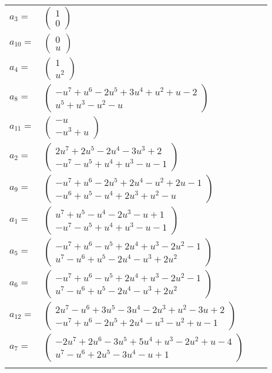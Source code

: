 \documentclass[1p]{elsarticle_modified}
\theoremstyle{definition}
\begin{document}
\begin{tabular}{m{7pt} m{180pt} m{7pt} m{180pt} }
\flushright $a_{3}=$&$\begin{pmatrix}1\\0\end{pmatrix}$ \\
\flushright $a_{10}=$&$\begin{pmatrix}0\\u\end{pmatrix}$ \\
\flushright $a_{4}=$&$\begin{pmatrix}1\\u^2\end{pmatrix}$ \\
\flushright $a_{8}=$&$\begin{pmatrix}- u^7+u^6-2 u^5+3 u^4+u^2+u-2\\u^5+u^3- u^2- u\end{pmatrix}$ \\
\flushright $a_{11}=$&$\begin{pmatrix}- u\\- u^3+u\end{pmatrix}$ \\
\flushright $a_{2}=$&$\begin{pmatrix}2 u^7+2 u^5-2 u^4-3 u^3+2\\- u^7- u^5+u^4+u^3- u-1\end{pmatrix}$ \\
\flushright $a_{9}=$&$\begin{pmatrix}- u^7+u^6-2 u^5+2 u^4- u^2+2 u-1\\- u^6+u^5- u^4+2 u^3+u^2- u\end{pmatrix}$ \\
\flushright $a_{1}=$&$\begin{pmatrix}u^7+u^5- u^4-2 u^3- u+1\\- u^7- u^5+u^4+u^3- u-1\end{pmatrix}$ \\
\flushright $a_{5}=$&$\begin{pmatrix}- u^7+u^6- u^5+2 u^4+u^3-2 u^2-1\\u^7- u^6+u^5-2 u^4- u^3+2 u^2\end{pmatrix}$ \\
\flushright $a_{6}=$&$\begin{pmatrix}- u^7+u^6- u^5+2 u^4+u^3-2 u^2-1\\u^7- u^6+u^5-2 u^4- u^3+2 u^2\end{pmatrix}$ \\
\flushright $a_{12}=$&$\begin{pmatrix}2 u^7- u^6+3 u^5-3 u^4-2 u^3+u^2-3 u+2\\- u^7+u^6-2 u^5+2 u^4- u^3- u^2+u-1\end{pmatrix}$ \\
\flushright $a_{7}=$&$\begin{pmatrix}-2 u^7+2 u^6-3 u^5+5 u^4+u^3-2 u^2+u-4\\u^7- u^6+2 u^5-3 u^4- u+1\end{pmatrix}$\\&\end{tabular}
\end{document}
